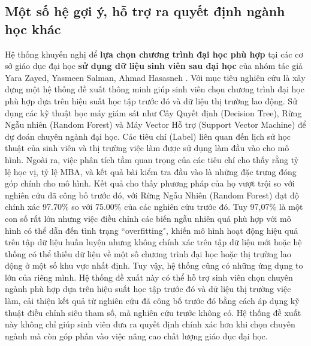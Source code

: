 \subsection{Một số hệ gợi ý, hỗ trợ ra quyết định ngành học khác}
Hệ thống khuyến nghị để \textbf{lựa chọn chương trình đại học phù hợp} tại các cơ sở giáo dục đại học \textbf{sử dụng dữ liệu sinh viên sau đại học} của nhóm tác giả Yara Zayed, Yasmeen Salman, Ahmad Hasasneh \cite{yara}. Với mục tiêu nghiên cứu là  xây dựng một hệ thống đề xuất thông minh giúp sinh viên chọn chương trình đại học phù hợp dựa trên hiệu suất học tập trước đó và dữ liệu thị trường lao động. Sử dụng các kỹ thuật học máy giám sát như Cây Quyết định (Decision Tree), Rừng Ngẫu nhiên (Random Forest) và Máy Vector Hỗ trợ (Support Vector Machine) để dự đoán chuyên ngành đại học. Các tiêu chí (Label) liên quan đến lịch sử học thuật của sinh viên và thị trường việc làm được sử dụng làm đầu vào cho mô hình. Ngoài ra, việc phân tích tầm quan trọng của các tiêu chí cho thấy rằng tỷ lệ học vị, tỷ lệ MBA, và kết quả bài kiểm tra đầu vào là những đặc trưng đóng góp chính cho mô hình. Kết quả cho thấy phương pháp của họ vượt trội so với nghiên cứu đã công bố trước đó, với Rừng Ngẫu Nhiên (Random Forest) đạt độ chính xác 97.70\% so với 75.00\% của các nghiên cứu trước đó. Tuy 97,07\% là một con số rất lớn nhưng việc điều chỉnh các biến ngẫu nhiên quá phù hợp với mô hình có thể dẫn đến tình trạng ``overfitting", khiến mô hình hoạt động hiệu quả trên tập dữ liệu huấn luyện nhưng không chính xác trên tập dữ liệu mới hoặc hệ thống có thể thiếu dữ liệu về một số chương trình đại học hoặc thị trường lao động ở một số khu vực nhất định. Tuy vậy, hệ thống cũng có những ứng dụng to lớn của riêng mình. Hệ thống đề xuất này có thể hỗ trợ sinh viên chọn chuyên ngành phù hợp dựa trên hiệu suất học tập trước đó và dữ liệu thị trường việc làm, cải thiện kết quả từ nghiên cứu đã công bố trước đó bằng cách áp dụng kỹ thuật điều chỉnh siêu tham số, mà nghiên cứu trước không có. Hệ thống đề xuất này không chỉ giúp sinh viên đưa ra quyết định chính xác hơn khi chọn chuyên ngành mà còn góp phần vào việc nâng cao chất lượng giáo dục đại học.

